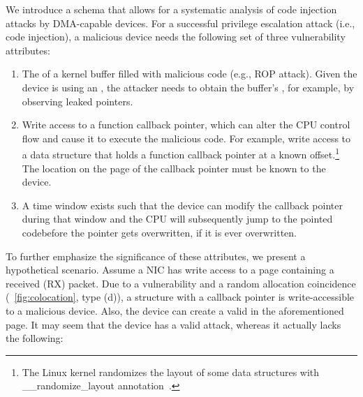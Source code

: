 We introduce a schema that allows for a systematic analysis of code injection attacks by DMA-capable devices.
For a successful privilege escalation attack (i.e., code injection), a malicious device needs the following set of three vulnerability attributes:
\begin{enumerate}
    \item The \kva{} of a kernel buffer filled with malicious code (e.g., \DIFdelbegin {}\DIFdelend ROP attack). Given \DIFaddbegin {}\DIFaddend the device is using an \iova, the attacker needs to obtain the buffer's \kva{}, for example, by observing leaked pointers. 
    \item Write access to a function callback pointer, which can alter the CPU control flow and cause it to execute the malicious code. For example, \DIFaddbegin {}\DIFaddend write access to a data structure that holds a function callback pointer at a known offset.\footnote{The Linux kernel randomizes the layout of some data structures with \_\_randomize\_layout annotation~\cite{rand_layout}.} The location on the page of the callback pointer must be known to the device.
    \item A time window exists such that the device can modify the callback pointer during that window and the CPU will subsequently jump to the pointed code\DIFdelbegin \DIFdel{(}\DIFdelend \DIFaddbegin {}\DIFaddend before the pointer gets overwritten, if it is ever overwritten\DIFdelbegin \DIFdel{)}\DIFdelend .
\end{enumerate}

To further emphasize the significance of these attributes, we present a hypothetical scenario. Assume a NIC has write access to a page containing a received (RX) packet. Due to a \subpage{} vulnerability and a random allocation coincidence (\DIFdelbegin {}\DIFdelend \DIFaddbegin {}\DIFaddend ~\ref{fig:colocation}, type (d)), a structure with a callback pointer is write-accessible to a malicious device. Also, the device can create a valid \mabaf{} in the aforementioned page. It may seem that the device has a valid attack, whereas it actually lacks the following:

